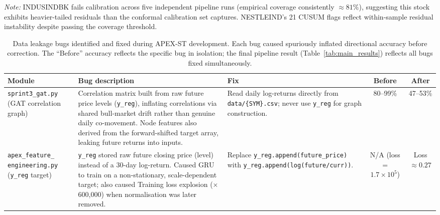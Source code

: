 \begin{table}[htbp]
\smallskip
\footnotesize
\textit{Note:} INDUSINDBK fails calibration across five independent pipeline
runs (empirical coverage consistently $\approx 81\%$), suggesting this stock
exhibits heavier-tailed residuals than the conformal calibration set captures.
NESTLEIND's 21 CUSUM flags reflect within-sample residual instability despite
passing the coverage threshold.
\end{table}


\begin{table}[htbp]
\centering
\caption{%
  Data leakage bugs identified and fixed during APEX-ST development.
  Each bug caused spuriously inflated directional accuracy before correction.
  The ``Before'' accuracy reflects the specific bug in isolation; the final
  pipeline result (Table~\ref{tab:main_results}) reflects all bugs fixed simultaneously.
}
\label{sec:bugs}
\label{tab:bugs}
\setlength{\tabcolsep}{5pt}
\begin{tabular}{p{2.8cm} p{4.5cm} p{3.5cm} c c}
\toprule
\textbf{Module} &
  \textbf{Bug description} &
  \textbf{Fix} &
  \textbf{Before} &
  \textbf{After} \\
\midrule

\texttt{sprint3\_gat.py} \newline (GAT correlation graph) &
  Correlation matrix built from raw future price levels (\texttt{y\_reg}),
  inflating correlations via shared bull-market drift rather than
  genuine daily co-movement. Node features also derived from the
  forward-shifted target array, leaking future returns into inputs. &
  Read daily log-returns directly from \texttt{data/\{SYM\}.csv};
  never use \texttt{y\_reg} for graph construction. &
  80--99\% &
  47--53\% \\

\addlinespace
\texttt{apex\_feature\_ engineering.py} \newline (\texttt{y\_reg} target) &
  \texttt{y\_reg} stored raw future closing price (level) instead of
  a 30-day log-return. Caused GRU to train on a non-stationary,
  scale-dependent target; also caused Training loss explosion
  ($\times$600{,}000) when normalisation was later removed. &
  Replace \texttt{y\_reg.append(future\_price)} with
  \texttt{y\_reg.append(log(future/curr))}. &
  N/A \newline (loss = $1.7 \times 10^5$) &
  Loss $\approx 0.27$ \\


\end{tabular}
\end{table}
